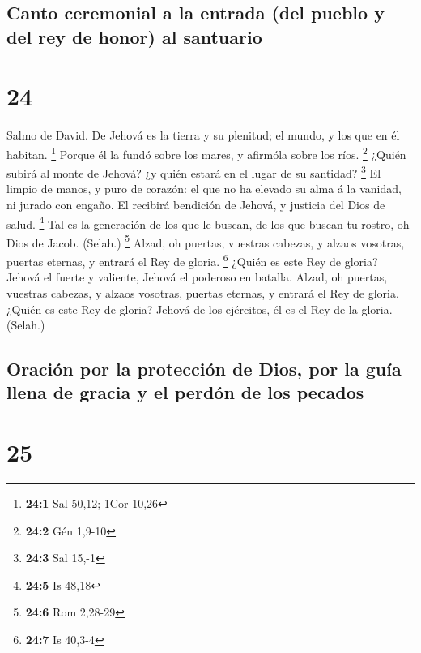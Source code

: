 \hypertarget{canto-ceremonial-a-la-entrada-del-pueblo-y-del-rey-de-honor-al-santuario}{%
\subsection{Canto ceremonial a la entrada (del pueblo y del rey de
honor) al
santuario}\label{canto-ceremonial-a-la-entrada-del-pueblo-y-del-rey-de-honor-al-santuario}}

\hypertarget{section-23}{%
\section{24}\label{section-23}}

 Salmo de David. De Jehová es la tierra y su plenitud; el
mundo, y los que en él habitan. \footnote{\textbf{24:1} Sal 50,12; 1Cor
  10,26}  Porque él la fundó sobre los mares, y afirmóla
sobre los ríos. \footnote{\textbf{24:2} Gén 1,9-10}  ¿Quién
subirá al monte de Jehová? ¿y quién estará en el lugar de su santidad?
\footnote{\textbf{24:3} Sal 15,-1}  El limpio de manos, y
puro de corazón: el que no ha elevado su alma á la vanidad, ni jurado
con engaño.  El recibirá bendición de Jehová, y justicia del
Dios de salud. \footnote{\textbf{24:5} Is 48,18}  Tal es la
generación de los que le buscan, de los que buscan tu rostro, oh Dios de
Jacob. (Selah.) \footnote{\textbf{24:6} Rom 2,28-29}  Alzad,
oh puertas, vuestras cabezas, y alzaos vosotras, puertas eternas, y
entrará el Rey de gloria. \footnote{\textbf{24:7} Is 40,3-4}
 ¿Quién es este Rey de gloria? Jehová el fuerte y valiente,
Jehová el poderoso en batalla.  Alzad, oh puertas, vuestras
cabezas, y alzaos vosotras, puertas eternas, y entrará el Rey de gloria.
 ¿Quién es este Rey de gloria? Jehová de los ejércitos, él
es el Rey de la gloria. (Selah.)

\hypertarget{oraciuxf3n-por-la-protecciuxf3n-de-dios-por-la-guuxeda-llena-de-gracia-y-el-perduxf3n-de-los-pecados}{%
\subsection{Oración por la protección de Dios, por la guía llena de
gracia y el perdón de los
pecados}\label{oraciuxf3n-por-la-protecciuxf3n-de-dios-por-la-guuxeda-llena-de-gracia-y-el-perduxf3n-de-los-pecados}}

\hypertarget{section-24}{%
\section{25}\label{section-24}}

